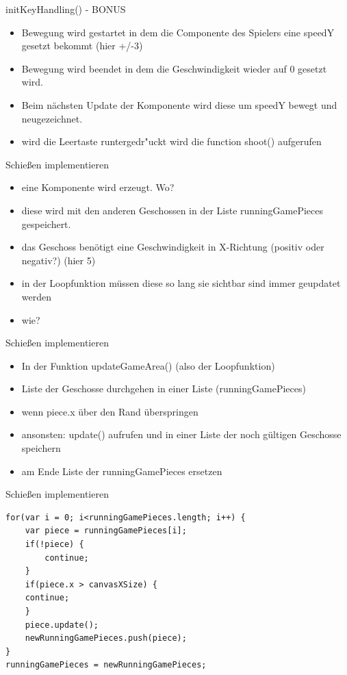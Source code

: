 \documentclass[18pt]{beamer}
\begin{document}
\begin{frame}{initKeyHandling() - BONUS}
\begin{itemize}
	\item Bewegung wird gestartet in dem die Componente des Spielers eine speedY gesetzt bekommt (hier +/-3)
	\item Bewegung wird beendet in dem die Geschwindigkeit wieder auf 0 gesetzt wird.
	\item Beim nächsten Update der Komponente wird diese um speedY bewegt und neugezeichnet.
	\item wird die Leertaste runtergedr"uckt wird die function shoot() aufgerufen
\end{itemize}
\end{frame}

\begin{frame}{Schießen implementieren}
\begin{itemize}
	\item eine Komponente wird erzeugt. Wo? 
	\item diese wird mit den anderen Geschossen in der Liste runningGamePieces gespeichert. 
	\item das Geschoss benötigt eine Geschwindigkeit in X-Richtung (positiv oder negativ?) (hier 5)
	\item in der Loopfunktion müssen diese so lang sie sichtbar sind immer geupdatet werden
	\item wie?
\end{itemize}
\end{frame}

\begin{frame}[fragile]{Schießen implementieren}
\begin{itemize}
	\item In der Funktion updateGameArea() (also der Loopfunktion)
	\item Liste der Geschosse durchgehen in einer Liste (runningGamePieces)
	\item wenn piece.x über den Rand überspringen
	\item ansonsten: update() aufrufen und in einer Liste der noch gültigen Geschosse speichern
	\item am Ende Liste der runningGamePieces ersetzen
\end{itemize}
\end{frame}

\begin{frame}[fragile]{Schießen implementieren}
\begin{lstlisting}
for(var i = 0; i<runningGamePieces.length; i++) {
	var piece = runningGamePieces[i];
	if(!piece) {
		continue;
	}
	if(piece.x > canvasXSize) {
	continue;
	}
	piece.update();
	newRunningGamePieces.push(piece);
}
runningGamePieces = newRunningGamePieces;
\end{lstlisting}
\end{frame}
\end{document}
